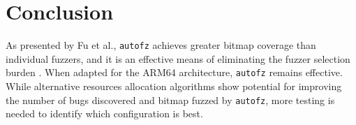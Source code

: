 \section{Conclusion}
As presented by Fu et al., \texttt{autofz} achieves greater bitmap coverage than individual 
fuzzers, and it is an effective means of eliminating the fuzzer selection burden \cite{fu_autofz_2023}. 
When adapted for the ARM64 architecture, \texttt{autofz} remains effective. 
While alternative resources allocation algorithms show potential for improving the number of bugs discovered
and bitmap fuzzed by \texttt{autofz}, more testing is needed to identify which configuration is best.
